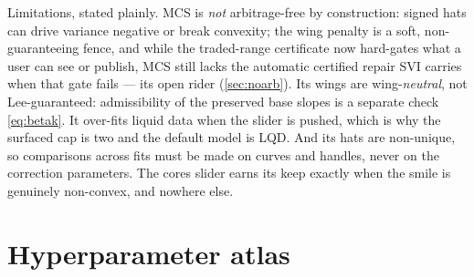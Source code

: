 \documentclass[11pt]{article}
\begin{document}
Limitations, stated plainly.  MCS is \emph{not} arbitrage-free by construction:
signed hats can drive variance negative or break convexity; the wing penalty
is a soft, non-guaranteeing fence, and while the traded-range certificate now
hard-gates what a user can see or publish, MCS still lacks the automatic
certified repair SVI carries when that gate fails --- its open rider
(\cref{sec:noarb}).  Its wings are wing-\emph{neutral}, not Lee-guaranteed:
admissibility of the preserved base slopes is a separate check
\eqref{eq:betak}.  It over-fits liquid data when the slider is pushed, which is
why the surfaced cap is two and the default model is LQD.  And its hats are
non-unique, so comparisons across fits must be made on curves and handles, never
on the correction parameters.  The cores slider earns its keep exactly when the
smile is genuinely non-convex, and nowhere else.

\appendix
\section{Hyperparameter atlas}
\label{app:atlas}
\end{document}
